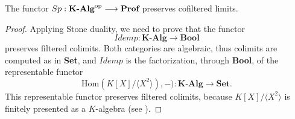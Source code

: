 \begin{lemma}
\label{lem:SpTransformsLimitColimit}
    The functor $Sp:{\textbf{K-Alg}}^{\mathrm{op}}\longrightarrow \textbf{Prof}$ preserves cofiltered limits.
    \begin{proof}
        Applying Stone duality, we need to prove that the functor
        \[ Idemp:\textbf{K-Alg}\longrightarrow\textbf{Bool} \]
        preserves filtered colimits. Both categories are algebraic, thus colimits are computed as in \textbf{Set}, and $Idemp$ is the factorization, through \textbf{Bool}, of the representable functor
        \[ \text{Hom}(K[X]/\langle X^2\rangle),-):\textbf{K-Alg}\longrightarrow\textbf{Set}. \]
        This representable functor preserves filtered colimits, because $K[X]/\langle X^2\rangle$ is finitely presented as a $K$-algebra (see \cite{rosicky1994locally}).
    \end{proof}

\end{lemma}

